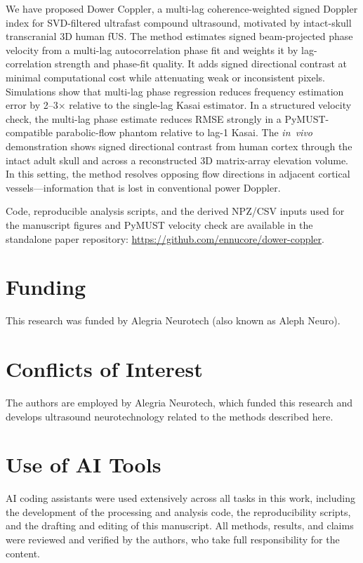 \documentclass[11pt]{article}
\begin{document}
We have proposed Dower Coppler, a multi-lag coherence-weighted signed
Doppler index for SVD-filtered ultrafast compound ultrasound, motivated
by intact-skull transcranial 3D human fUS.  The method estimates signed
beam-projected phase velocity from a multi-lag autocorrelation phase fit
and weights it by lag-correlation strength and phase-fit quality.  It
adds signed directional contrast at minimal computational cost while
attenuating weak or inconsistent pixels.  Simulations show that
multi-lag phase regression reduces frequency estimation error by
2--3$\times$ relative to the single-lag Kasai estimator.  In a
structured velocity check, the multi-lag phase estimate reduces RMSE
strongly in a PyMUST-compatible parabolic-flow phantom relative to
lag-1 Kasai.
The \textit{in~vivo} demonstration shows signed directional contrast
from human cortex through the intact adult skull and across a
reconstructed 3D matrix-array elevation volume.  In this setting, the
method resolves opposing flow directions in adjacent cortical
vessels---information that is lost in conventional power Doppler.

Code, reproducible analysis scripts, and the derived NPZ/CSV inputs
used for the manuscript figures and PyMUST velocity check are
available in the standalone paper repository:
\url{https://github.com/ennucore/dower-coppler}.

\section*{Funding}

This research was funded by Alegria Neurotech (also known as Aleph
Neuro).

\section*{Conflicts of Interest}

The authors are employed by Alegria Neurotech, which funded this
research and develops ultrasound neurotechnology related to the methods
described here.

\section*{Use of AI Tools}

AI coding assistants were used extensively across all tasks in this
work, including the development of the processing and analysis code, the
reproducibility scripts, and the drafting and editing of this
manuscript.  All methods, results, and claims were reviewed and verified
by the authors, who take full responsibility for the content.
\end{document}
